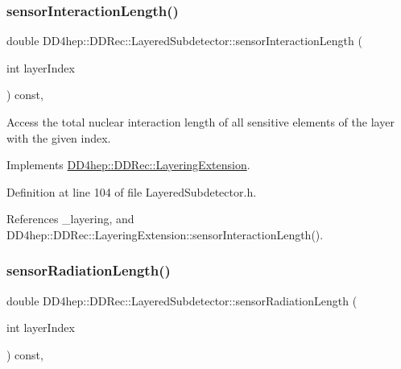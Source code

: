 \subsubsection{\texorpdfstring{sensor\+Interaction\+Length()}{sensorInteractionLength()}}
{\footnotesize\ttfamily double D\+D4hep\+::\+D\+D\+Rec\+::\+Layered\+Subdetector\+::sensor\+Interaction\+Length (\begin{DoxyParamCaption}\item[{int}]{layer\+Index }\end{DoxyParamCaption}) const\hspace{0.3cm}{\ttfamily [inline]}, {\ttfamily [virtual]}}



Access the total nuclear interaction length of all sensitive elements of the layer with the given index. 



Implements \hyperlink{class_d_d4hep_1_1_d_d_rec_1_1_layering_extension_a99d3faa45e42d0a34635ea7f3ac2c038}{D\+D4hep\+::\+D\+D\+Rec\+::\+Layering\+Extension}.



Definition at line 104 of file Layered\+Subdetector.\+h.



References \+\_\+layering, and D\+D4hep\+::\+D\+D\+Rec\+::\+Layering\+Extension\+::sensor\+Interaction\+Length().

\hypertarget{class_d_d4hep_1_1_d_d_rec_1_1_layered_subdetector_afa7d4fe8408b38a84c11900e5c080979}{}\label{class_d_d4hep_1_1_d_d_rec_1_1_layered_subdetector_afa7d4fe8408b38a84c11900e5c080979} 
\subsubsection{\texorpdfstring{sensor\+Radiation\+Length()}{sensorRadiationLength()}}
{\footnotesize\ttfamily double D\+D4hep\+::\+D\+D\+Rec\+::\+Layered\+Subdetector\+::sensor\+Radiation\+Length (\begin{DoxyParamCaption}\item[{int}]{layer\+Index }\end{DoxyParamCaption}) const\hspace{0.3cm}{\ttfamily [inline]}, {\ttfamily [virtual]}}



